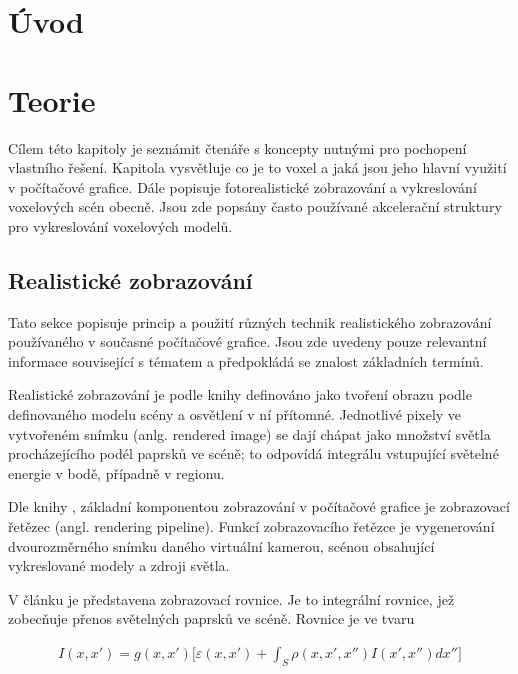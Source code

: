 

\chapter{Úvod}
\label{uvod}

\chapter{Teorie}
\label{teorie}
Cílem této kapitoly je seznámit čtenáře s koncepty nutnými pro pochopení vlastního řešení. Kapitola vysvětluje co je to voxel a jaká jsou jeho hlavní využití v počítačové grafice. Dále popisuje fotorealistické zobrazování a vykreslování voxelových scén obecně. Jsou zde popsány často používané akcelerační struktury pro vykreslování voxelových modelů.

\section{Realistické zobrazování}
Tato sekce popisuje princip a použití různých technik realistického zobrazování používaného v současné počítačové grafice. Jsou zde uvedeny pouze relevantní informace související s tématem a předpokládá se znalost základních termínů.

Realistické zobrazování je podle knihy \cite{gfx_principles_practice} definováno jako tvoření obrazu podle definovaného modelu scény a osvětlení v ní přítomné. Jednotlivé pixely ve vytvořeném snímku (anlg. rendered image) se dají chápat jako množství světla procházejícího podél paprsků ve scéně; to odpovídá integrálu vstupující světelné energie v bodě, případně v regionu.

Dle knihy \cite{real_time_render}, základní komponentou zobrazování v počítačové grafice je zobrazovací řetězec (angl. rendering pipeline). Funkcí zobrazovacího řetězce je vygenerování dvourozměrného snímku daného virtuální kamerou, scénou obsahující vykreslované modely a zdroji světla.

V článku \cite{render_eq} je představena zobrazovací rovnice. Je to integrální rovnice, jež zobecňuje přenos světelných paprsků ve scéně. Rovnice je ve tvaru

\begin{equation} \label{eq:render}
\begin{gathered}
I(x, x') = g(x, x') \Big[\varepsilon(x, x') + \int_S\rho(x, x', x'')I(x', x'')dx''\Big]
\end{gathered}
\end{equation}

